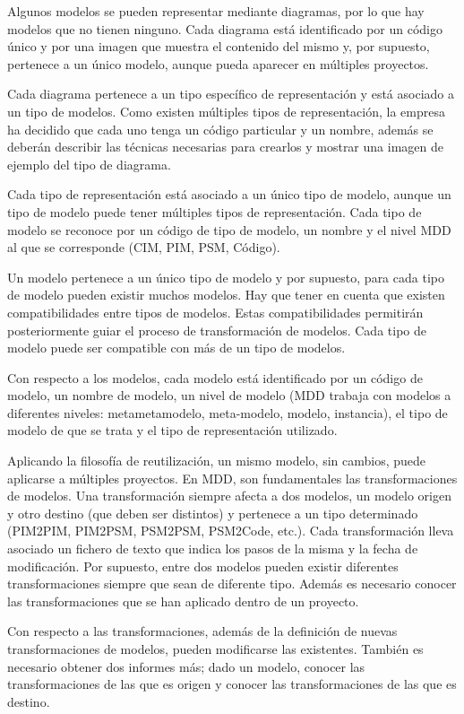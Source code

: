 \documentclass{db-practice}
\begin{document}
Algunos modelos se pueden representar mediante diagramas, por lo que hay modelos que no
tienen ninguno. Cada diagrama está identificado por un código único y por una imagen que muestra el contenido del mismo y, por supuesto, pertenece a un único modelo, aunque pueda aparecer en múltiples proyectos.

Cada diagrama pertenece a un tipo específico de representación y está asociado a un tipo de modelos. Como existen múltiples tipos de representación, la empresa ha decidido que cada uno tenga un código particular y un nombre, además se deberán describir las técnicas necesarias para crearlos y mostrar una imagen de ejemplo del tipo de diagrama.

Cada tipo de representación está asociado a un único tipo de modelo, aunque un tipo de
modelo puede tener múltiples tipos de representación. Cada tipo de modelo se reconoce por un código de tipo de modelo, un nombre y el nivel MDD al que se corresponde (CIM, PIM, PSM, Código).

Un modelo pertenece a un único tipo de modelo y por supuesto, para cada tipo de modelo pueden existir muchos modelos. Hay que tener en cuenta que existen compatibilidades entre tipos de modelos. Estas compatibilidades permitirán posteriormente guiar el proceso de transformación de modelos. Cada tipo de modelo puede ser compatible con más de un tipo de modelos.

Con respecto a los modelos, cada modelo está identificado por un código de modelo, un nombre de modelo, un nivel de modelo (MDD trabaja con modelos a diferentes niveles: metametamodelo, meta-modelo, modelo, instancia), el tipo de modelo de que se trata y el tipo de representación utilizado.

Aplicando la filosofía de reutilización, un mismo modelo, sin cambios, puede aplicarse a múltiples proyectos. En MDD, son fundamentales las transformaciones de modelos. Una transformación siempre afecta a dos modelos, un modelo origen y otro destino (que deben ser distintos) y pertenece a un tipo determinado (PIM2PIM, PIM2PSM, PSM2PSM, PSM2Code, etc.). Cada transformación lleva asociado un fichero de texto que indica los pasos de la misma y la fecha de modificación. Por supuesto, entre dos modelos pueden existir diferentes transformaciones siempre que sean de diferente tipo. Además es necesario conocer las transformaciones que se han aplicado dentro de un proyecto.

Con respecto a las transformaciones, además de la definición de nuevas transformaciones de modelos, pueden modificarse las existentes. También es necesario obtener dos informes más; dado un modelo, conocer las transformaciones de las que es origen y conocer las transformaciones de las que es destino.
\end{document}
